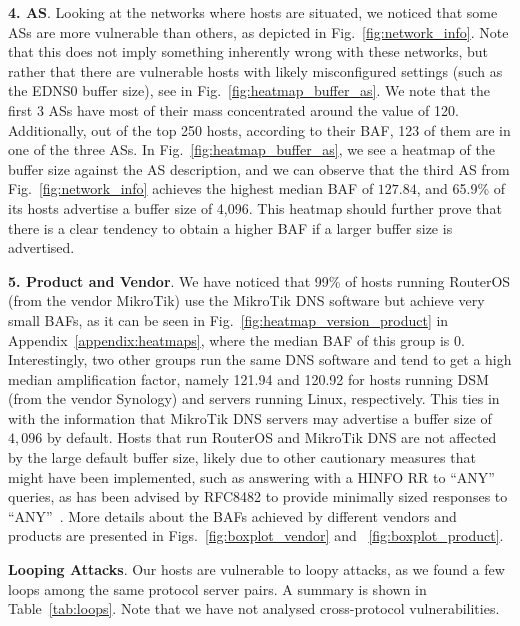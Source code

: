  \noindent \textbf{4. AS}. Looking at the networks where hosts are situated, we noticed that some ASs are more vulnerable than others, as depicted in Fig.~\ref{fig:network_info}. Note that this does not imply something inherently wrong with these networks, but rather that there are vulnerable hosts with likely misconfigured settings (such as the EDNS0 buffer size), see in Fig.~\ref{fig:heatmap_buffer_as}. We note that the first 3 ASs have most of their mass concentrated around the value of 120. Additionally, out of the top 250 hosts, according to their BAF, 123 of them are in one of the three ASs. In Fig.~\ref{fig:heatmap_buffer_as}, we see a heatmap of the buffer size against the AS description, and we can observe that the third AS from Fig.~\ref{fig:network_info} achieves the highest median BAF of $127.84$, and 65.9\% of its hosts advertise a buffer size of 4,096. This heatmap should further prove that there is a clear tendency to obtain a higher BAF if a larger buffer size is advertised. 



 \noindent \textbf{5. Product and Vendor}. We have noticed that 99\% of hosts running RouterOS (from the vendor MikroTik) use the MikroTik DNS software but achieve very small BAFs, as it can be seen in Fig.~\ref{fig:heatmap_version_product} in Appendix~\ref{appendix:heatmaps}, where the median BAF of this group is 0. Interestingly, two other groups run the same DNS software and tend to get a high median amplification factor, namely 121.94 and 120.92 for hosts running DSM (from the vendor Synology) \cite{dsm} and servers running Linux, respectively. This ties in with the information that MikroTik DNS servers may advertise a buffer size of $4,096$ by default. Hosts that run RouterOS and MikroTik DNS are not affected by the large default buffer size, likely due to other cautionary measures that might have been implemented, such as answering with a HINFO RR to ``ANY'' queries, as has been advised by RFC8482 to provide minimally sized responses to ``ANY''~\cite{rfc-8482}. More details about the BAFs achieved by different vendors and products are presented in Figs.~\ref{fig:boxplot_vendor} and ~\ref{fig:boxplot_product}.
     

 \textbf{Looping Attacks}. Our hosts are vulnerable to loopy attacks, as we found a few loops among the same protocol server pairs. A summary is shown in Table~\ref{tab:loops}. Note that we have not analysed cross-protocol vulnerabilities. 

